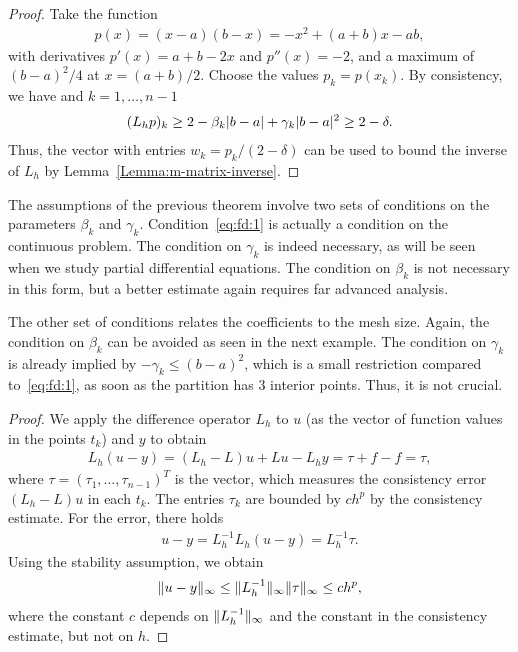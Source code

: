 

\begin{proof}
  Take the function
  \begin{gather*}
    p(x) = (x-a)(b-x) = -x^2+(a+b)x-ab,
  \end{gather*}
  with derivatives $p'(x) = a+b-2x$ and $p''(x) = -2$, and a maximum
  of $(b-a)^2/4$ at $x=(a+b)/2$. Choose the values $p_k = p(x_k)$. By
  consistency, we have and $k=1,\dots,n-1$
  \begin{gather*}
    (L_h p)_k \ge 2 - \beta_k\lvert b-a\rvert + \gamma_k \lvert b-a\rvert^2
    \ge 2-\delta.
  \end{gather*}
  Thus, the vector with entries $w_k = p_k/(2-\delta)$ can be used to
  bound the inverse of $L_h$ by Lemma~\ref{Lemma:m-matrix-inverse}.
\end{proof}

\begin{remark}
  The assumptions of the previous theorem involve two sets of
  conditions on the parameters $\beta_k$ and
  $\gamma_k$. Condition~\eqref{eq:fd:1} is actually a condition on the
  continuous problem. The condition on $\gamma_k$ is indeed necessary,
  as will be seen when we study partial differential equations. The
  condition on $\beta_k$ is not necessary in this form, but a better
  estimate again requires far advanced analysis.

  The other set of conditions relates the coefficients to the mesh
  size. Again, the condition on $\beta_k$ can be avoided as seen in
  the next example. The condition on $\gamma_k$ is already implied by
  $-\gamma_k \le (b-a)^2$, which is a small restriction compared
  to~\eqref{eq:fd:1}, as soon as the partition has 3 interior
  points. Thus, it is not crucial.
\end{remark}




\begin{proof}
  We apply the difference operator $L_h$ to $u$ (as the vector of
  function values in the points $t_k$) and $y$ to obtain
  \begin{gather*}
    L_h(u-y) = (L_h - L) u + Lu - L_h y = \tau + f - f = \tau,
  \end{gather*}
  where $\tau = (\tau_1,\dots,\tau_{n-1})^T$ is the vector, which
  measures the consistency error  $(L_h-L) u$ in each $t_k$. The
  entries $\tau_k$ are bounded by $c h^p$ by the consistency estimate.
  For the error, there holds
  \begin{gather*}
    u-y = L_h^{-1} L_h(u-y) =  L_h^{-1} \tau.
  \end{gather*}
  Using the stability assumption, we obtain
  \begin{gather*}
    \lVert u-y\rVert_\infty \le \lVert L_h^{-1}\rVert_\infty \lVert\tau\rVert_\infty
    \le c h^p,
  \end{gather*}
  where the constant $c$ depends on $\lVert L_h^{-1}\rVert_\infty$ and the
  constant in the consistency estimate, but not on $h$.
\end{proof}

